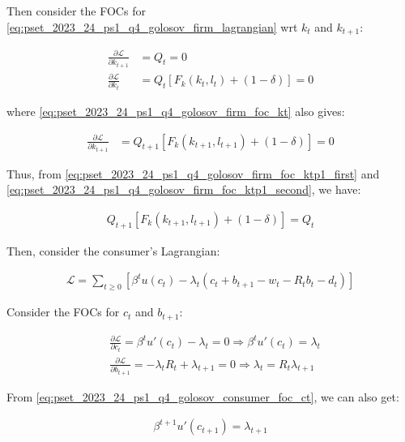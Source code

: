 Then consider the FOCs for \eqref{eq:pset_2023_24_ps1_q4_golosov_firm_lagrangian} wrt $k_t$ and $k_{t+1}$:

\begin{align}
    \frac{\partial \mathcal{L}}{\partial k_{t+1}} &= Q_t = 0 \label{eq:pset_2023_24_ps1_q4_golosov_firm_foc_ktp1_first} \\
    \frac{\partial \mathcal{L}}{\partial k_{t}} &= Q_t[F_k(k_t, l_t) + (1 - \delta)] = 0 \label{eq:pset_2023_24_ps1_q4_golosov_firm_foc_kt}
\end{align}

where \eqref{eq:pset_2023_24_ps1_q4_golosov_firm_foc_kt} also gives:

\begin{align}
    \frac{\partial \mathcal{L}}{\partial k_{t+1}} &= Q_{t+1}[F_k(k_{t+1}, l_{t+1}) + (1 - \delta)] = 0 \label{eq:pset_2023_24_ps1_q4_golosov_firm_foc_ktp1_second}
\end{align}

Thus, from \eqref{eq:pset_2023_24_ps1_q4_golosov_firm_foc_ktp1_first} and \eqref{eq:pset_2023_24_ps1_q4_golosov_firm_foc_ktp1_second}, we have:

\begin{align}
    Q_{t+1}[F_k(k_{t+1}, l_{t+1}) + (1 - \delta)] = Q_t \label{eq:pset_2023_24_ps1_q4_golosov_firm_foc_result}
\end{align}

Then, consider the consumer's Lagrangian:

\begin{align}
    \mathcal{L} = \sum_{t \geq 0}[ \beta^t u(c_t) - \lambda_t(c_t + b_{t+1} - w_t - R_tb_t - d_t)]
\end{align}

Consider the FOCs for $c_t$ and $b_{t+1}$:

\begin{align}
    &\frac{\partial \mathcal{L}}{\partial c_t} = \beta^t u'(c_t) - \lambda_t = 0 \Rightarrow \beta^t u'(c_t) = \lambda_t \label{eq:pset_2023_24_ps1_q4_golosov_consumer_foc_ct} \\
    &\frac{\partial \mathcal{L}}{\partial b_{t+1}} = -\lambda_t R_t + \lambda_{t+1} = 0 \Rightarrow \lambda_t = R_t \lambda_{t+1} \label{eq:pset_2023_24_ps1_q4_golosov_consumer_foc_bt1}
\end{align}

From \eqref{eq:pset_2023_24_ps1_q4_golosov_consumer_foc_ct}, we can also get:

\begin{align}
    \beta^{t+1} u'(c_{t+1}) = \lambda_{t+1} \label{eq:pset_2023_24_ps1_q4_golosov_consumer_foc_ctp1}
\end{align}

